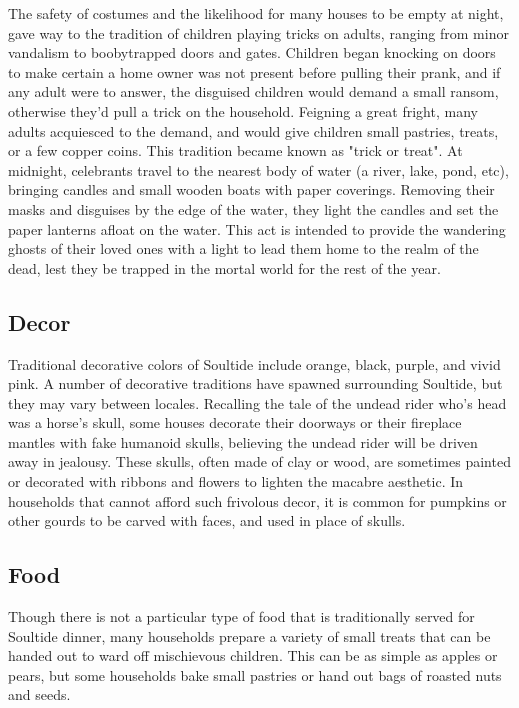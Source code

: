 \documentclass[10pt,a4paper,twoside,twocolumn,openany,bg=print,nodeprecatedcode]{dndbook}
\begin{document}
The safety of costumes and the likelihood for many houses to be empty at night, gave way to the tradition of children playing tricks on adults, ranging from minor vandalism to boobytrapped doors and gates. Children began knocking on doors to make certain a home owner was not present before pulling their prank, and if any adult were to answer, the disguised children would demand a small ransom, otherwise they'd pull a trick on the household. Feigning a great fright, many adults acquiesced to the demand, and would give children small pastries, treats, or a few copper coins. This tradition became known as "trick or treat".
At midnight, celebrants travel to the nearest body of water (a river, lake, pond, etc), bringing candles and small wooden boats with paper coverings. Removing their masks and disguises by the edge of the water, they light the candles and set the paper lanterns afloat on the water. This act is intended to provide the wandering ghosts of their loved ones with a light to lead them home to the realm of the dead, lest they be trapped in the mortal world for the rest of the year.
\subsection{Decor}
Traditional decorative colors of Soultide include orange, black, purple, and vivid pink. A number of decorative traditions have spawned surrounding Soultide, but they may vary between locales. Recalling the tale of the undead rider who's head was a horse's skull, some houses decorate their doorways or their fireplace mantles with fake humanoid skulls, believing the undead rider will be driven away in jealousy. These skulls, often made of clay or wood, are sometimes painted or decorated with ribbons and flowers to lighten the macabre aesthetic. In households that cannot afford such frivolous decor, it is common for pumpkins or other gourds to be carved with faces, and used in place of skulls.
\subsection{Food}
Though there is not a particular type of food that is traditionally served for Soultide dinner, many households prepare a variety of small treats that can be handed out to ward off mischievous children. This can be as simple as apples or pears, but some households bake small pastries or hand out bags of roasted nuts and seeds.
\end{document}
